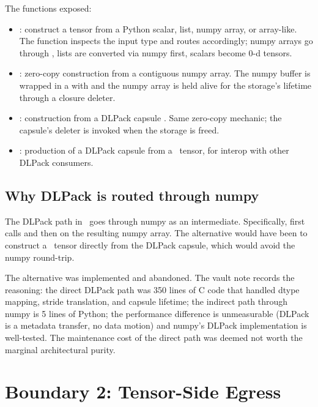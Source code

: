 The functions exposed:

\begin{itemize}
  \item {}:
    construct a tensor from a Python scalar, list, numpy array, or
    array-like. The function inspects the input type and routes
    accordingly; numpy arrays go through , lists
    are converted via numpy first, scalars become 0-d tensors.
  \item {}: zero-copy construction from
    a contiguous numpy array. The numpy buffer is wrapped in a
     with  and the numpy
    array is held alive for the storage's lifetime through a
    closure deleter.
  \item {}: construction from a
    DLPack capsule \cite{dlpack}. Same zero-copy mechanic; the
    capsule's deleter is invoked when the storage is freed.
  \item {}: production of a DLPack
    capsule from a \Lucid\ tensor, for interop with other DLPack
    consumers.
\end{itemize}

\subsection{Why DLPack is routed through numpy}
\label{ssec:bridge_boundaries:dlpack_numpy}

The DLPack path in \Lucid\ goes through numpy as an intermediate.
Specifically,  first calls
 and then  on
the resulting numpy array. The alternative would have been to
construct a \Lucid\ tensor directly from the DLPack capsule, which
would avoid the numpy round-trip.

The alternative was implemented and abandoned. The vault note
 records the reasoning: the direct
DLPack path was 350 lines of C code that handled dtype mapping,
stride translation, and capsule lifetime; the indirect path through
numpy is 5 lines of Python; the performance difference is
unmeasurable (DLPack is a metadata transfer, no data motion) and
numpy's DLPack implementation is well-tested. The maintenance cost
of the direct path was deemed not worth the marginal architectural
purity.

\section{Boundary 2: Tensor-Side Egress}
\label{sec:bridge_boundaries:b2}

